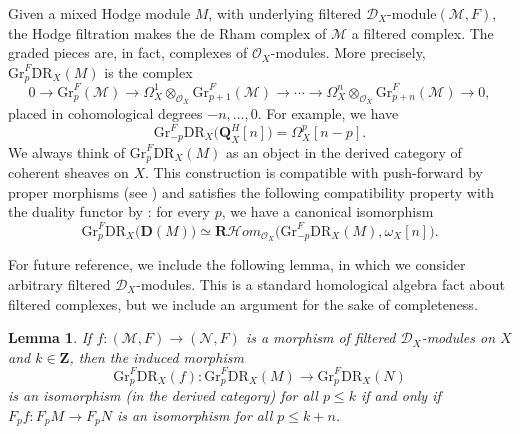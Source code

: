\documentclass[JEP,XML,SOM,Unicode]{cedram}
\newcommand{\DXmodule}{$\cD_X$\nobreakdash-mod\-ule\xspace}
\newcommand{\DXmodules}{$\cD_X$\nobreakdash-mod\-ules\xspace}
\theoremstyle{plain}
\newtheorem{lem}[thm]{Lemma}
\theoremstyle{definition}
\newcommand\Z{{\mathbf Z}}
\newcommand\Q{{\mathbf Q}}
\newcommand\R{{\mathbf R}}
\newcommand\cD{\mathcal{D}}
\newcommand\cH{\mathcal{H}}
\newcommand\cO{\mathcal{O}}
\newcommand\cM{\mathcal{M}}
\newcommand\cN{\mathcal{N}}
\newcommand\cH{\mathcal{H}}
\newcommand\cO{\mathcal{O}}
\newcommand\gr{\mathrm{Gr}}
\newcommand\DR{\mathrm{DR}}
\begin{document}
Given a mixed Hodge module $M$, with underlying filtered \DXmodule $(\cM,F)$, the Hodge filtration makes the de Rham complex of $\cM$ a filtered complex. The graded pieces
are, in fact, complexes of $\cO_X$-modules. More precisely, $\gr_p^F\DR_X(M)$ is the complex
\[0\to \gr_p^F(\cM)\to\Omega_X^1\otimes_{\cO_X}\gr_{p+1}^F(\cM)\to \cdots\to \Omega_X^n\otimes_{\cO_X}\gr_{p+n}^F(\cM)\to 0,\]
placed in cohomological degrees $-n,\ldots,0$. For example, we have
\[\gr_{-p}^F\DR_X\big(\Q_X^H[n]\big)=\Omega_X^p[n-p].\]
We always think of $\gr^F_p\DR_X(M)$ as an object in the derived category of coherent sheaves on $X$.
This construction is compatible with push-forward by proper morphisms (see \cite[\S 2.3.7]{Saito_MHP}) and satisfies the following compatibility property with the duality functor
by \cite[.5 \& 2.4.11]{Saito_MHP}: for every $p$, we have a canonical isomorphism
\begin{equation}\label{eq_compat_with_duality}
\gr^F_p\DR_X\big({\mathbf D}(M)\big)\simeq \R\cH om_{\cO_X}\big(\gr^F_{-p}\DR_X(M),\omega_X[n]\big).
\end{equation}

For future reference, we include the following lemma, in which we consider arbitrary filtered \DXmodules. This is a standard homological algebra fact
about filtered complexes, but we include an argument for the sake of completeness.

\begin{lem}\label{general_lemma}
If $f\colon (\cM,F)\to (\cN,F)$
is a morphism of filtered \DXmodules on $X$ and $k\in\Z$, then the induced morphism
\[\gr^F_p\DR_X(f)\colon \gr^F_p\DR_X(M)\to \gr^F_p\DR_X(N)\] is an isomorphism (in the derived category) for all $p\leq k$
if and only if $F_pf\colon F_pM\to F_pN$ is an isomorphism for all $p\leq k+n$.
\end{lem}
\end{document}
